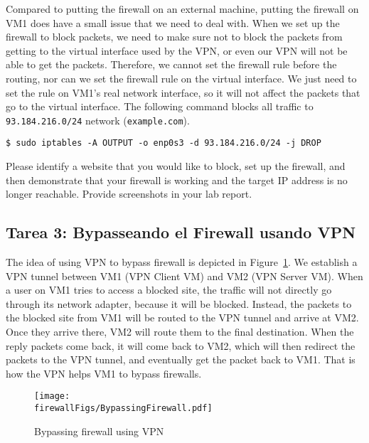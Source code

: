 Compared to putting the firewall on an external machine, putting the firewall on VM1 does have
a small issue that we need to deal with. When we set up the firewall to block packets, we need
to make sure not to block the packets from getting to the virtual interface used by the VPN, or even our
VPN will not be able to get the packets.  Therefore, we cannot set the firewall rule before the
routing, nor can we set the firewall rule on the virtual interface. We just need to set the
rule on VM1's real network interface, so it will not affect the packets that go to the virtual
interface. The following command blocks all traffic to \texttt{93.184.216.0/24} 
network (\texttt{example.com}). 

\begin{lstlisting}
$ sudo iptables -A OUTPUT -o enp0s3 -d 93.184.216.0/24 -j DROP
\end{lstlisting}

Please identify a website that you would like to block, set up the firewall,
and then demonstrate that your firewall is working and the target IP address is no longer 
reachable. Provide screenshots in your lab report.  


\subsection{Tarea 3: Bypasseando el Firewall usando VPN}



The idea of using VPN to bypass firewall is depicted in 
Figure~\ref{vpn_firewall:fig:bypassing}. 
We establish a VPN tunnel between VM1 (VPN Client VM) 
and VM2 (VPN Server VM). 
When a user on VM1 tries to access a blocked site, the traffic will not directly 
go through its network adapter, because it will be blocked. Instead, the 
packets to the blocked site from VM1 will be routed to the VPN tunnel and arrive at VM2. Once
they arrive there, VM2 will route them to the final destination. 
When the reply packets come back, it will come back to VM2, which will then redirect the
packets to the VPN tunnel, and eventually get the packet back to VM1. That is how the VPN helps
VM1 to bypass firewalls. 

\begin{figure}[htb]
\begin{center}
\texttt{[image: \\firewallFigs/BypassingFirewall.pdf]}
\end{center}
\caption{Bypassing firewall using VPN}
\label{vpn_firewall:fig:bypassing}
\end{figure}
 


